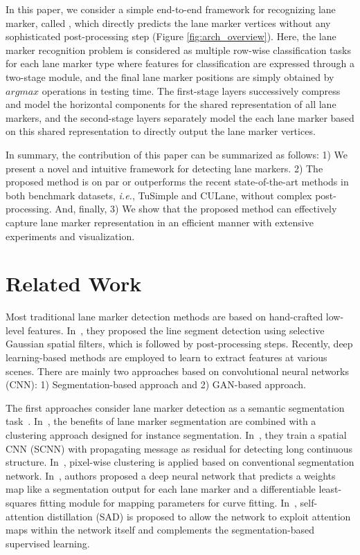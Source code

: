 \documentclass[10pt,twocolumn,letterpaper]{article}
\begin{document}
In this paper, we consider a simple end-to-end framework for recognizing lane marker, called \textit{\algorithmname}, which directly predicts the lane marker vertices without any sophisticated post-processing step (Figure \ref{fig:arch_overview}). Here, the lane marker recognition problem is considered as multiple row-wise classification tasks for each lane marker type where features for classification are expressed through a two-stage module, and the final lane marker positions are simply obtained by $\textit{argmax}$ operations in testing time. The first-stage layers successively compress and model the horizontal components for the shared representation of all lane markers, and the second-stage layers separately model the each lane marker based on this shared representation to directly output the lane marker vertices.

In summary, the contribution of this paper can be summarized as follows: 1) We present a novel and intuitive framework for detecting lane markers. 2) The proposed method is on par or outperforms the recent state-of-the-art methods in both benchmark datasets, \textit{i.e.}, TuSimple and CULane, without complex post-processing. And, finally, 3) We show that the proposed method can effectively capture lane marker representation in an efficient manner with extensive experiments and visualization.  


\section{Related Work}
\label{sec:Related_Work} 

Most traditional lane marker detection methods are based on hand-crafted low-level features. In~\cite{CV_Lane}, they proposed the line segment detection using selective Gaussian spatial filters, which is followed by post-processing steps. Recently, deep learning-based methods are employed to learn to extract features at various scenes. There are mainly two approaches based on convolutional neural networks (CNN): 1) Segmentation-based approach and 2) GAN-based approach.

The first approaches consider lane marker detection as a semantic segmentation task~\cite{SpatialAsDeep, IV_Instance, Fitting, Clustering, SAD}. In~\cite{IV_Instance},  the benefits of lane marker segmentation are combined with a clustering approach designed for instance segmentation. In~\cite{SpatialAsDeep}, they train a spatial CNN (SCNN) with propagating message as residual for detecting long continuous structure. In~\cite{Clustering}, pixel-wise clustering is applied based on conventional segmentation network. In~\cite{Fitting}, authors proposed a deep neural network that predicts a weights map like a segmentation output for each lane marker and a differentiable least-squares fitting module for mapping parameters for curve fitting. In~\cite{SAD}, self-attention distillation (SAD) is proposed to allow the network to exploit attention maps within the network itself and complements the segmentation-based supervised learning.
\end{document}

